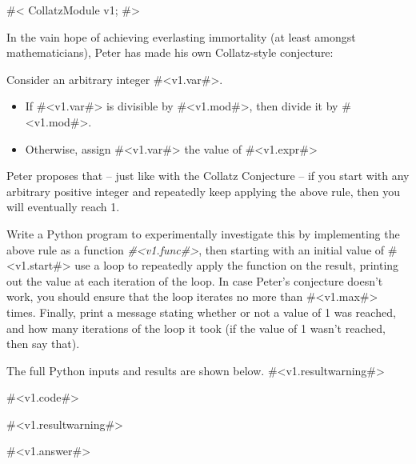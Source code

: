 

#<
CollatzModule v1;
#>

In the vain hope of achieving everlasting immortality (at least
amongst mathematicians), Peter has made his own Collatz-style
conjecture:

Consider an arbitrary integer #<v1.var#>.
\begin{itemize}
\item If #<v1.var#> is divisible by #<v1.mod#>, then divide it by #<v1.mod#>.
\item Otherwise, assign #<v1.var#> the value of #<v1.expr#>
\end{itemize}

Peter proposes that -- just like with the Collatz Conjecture -- if you
start with any arbitrary positive integer and repeatedly keep applying
the above rule, then you will eventually reach 1.

Write a Python program to experimentally investigate this by
implementing the above rule as a function \emph{#<v1.func#>}, then
starting with an initial value of #<v1.start#> use a loop to
repeatedly apply the function on the result, printing out the value at
each iteration of the loop.  In case Peter's conjecture doesn't work,
you should ensure that the loop iterates no more than #<v1.max#>
times.  Finally, print a message stating whether or not a value of 1
was reached, and how many iterations of the loop it took (if the value
of 1 wasn't reached, then say that).


The full Python inputs and results are shown below.  #<v1.resultwarning#>

#<v1.code#>


#<v1.resultwarning#>

#<v1.answer#>



